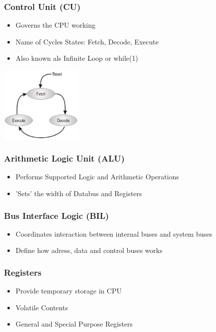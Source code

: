 \begin{multicols}{2}
	\subsubsection{Control Unit (CU)}   
		\begin{itemize}
			\item Governs the CPU working
			\item Name of Cycles States: Fetch, Decode, Execute
			\item Also known als Infinite Loop or while(1)
		\end{itemize}
	\includegraphics[width=4cm]{images/FDELoop}		
	\subsubsection{Arithmetic Logic Unit (ALU)}
	\begin{itemize}
		\item Performs Supported Logic and Arithmetic Operations
		\item 'Sets' the width of Databus and Registers
	\end{itemize}	
	\subsubsection{Bus Interface Logic (BIL)}
	\begin{itemize}
		\item Coordinates interaction between internal buses and system buses
		\item Define how adress, data and control buses works
	\end{itemize}	
	\subsubsection{Registers}
	\begin{itemize}
		\item Provide temporary storage in CPU
		\item Volatile Contents
		\item General and Special Purpose Registers
	\end{itemize}

\end{multicols}
